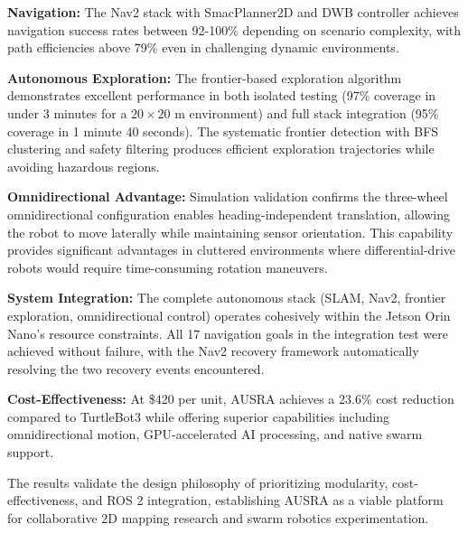 \textbf{Navigation:} The Nav2 stack with SmacPlanner2D and DWB controller achieves navigation success rates between 92-100\% depending on scenario complexity, with path efficiencies above 79\% even in challenging dynamic environments.

\textbf{Autonomous Exploration:} The frontier-based exploration algorithm demonstrates excellent performance in both isolated testing (97\% coverage in under 3 minutes for a $20 \times 20$ m environment) and full stack integration (95\% coverage in 1 minute 40 seconds). The systematic frontier detection with BFS clustering and safety filtering produces efficient exploration trajectories while avoiding hazardous regions.

\textbf{Omnidirectional Advantage:} Simulation validation confirms the three-wheel omnidirectional configuration enables heading-independent translation, allowing the robot to move laterally while maintaining sensor orientation. This capability provides significant advantages in cluttered environments where differential-drive robots would require time-consuming rotation maneuvers.

\textbf{System Integration:} The complete autonomous stack (SLAM, Nav2, frontier exploration, omnidirectional control) operates cohesively within the Jetson Orin Nano's resource constraints. All 17 navigation goals in the integration test were achieved without failure, with the Nav2 recovery framework automatically resolving the two recovery events encountered.

\textbf{Cost-Effectiveness:} At \$420 per unit, AUSRA achieves a 23.6\% cost reduction compared to TurtleBot3 while offering superior capabilities including omnidirectional motion, GPU-accelerated AI processing, and native swarm support.

The results validate the design philosophy of prioritizing modularity, cost-effectiveness, and ROS 2 integration, establishing AUSRA as a viable platform for collaborative 2D mapping research and swarm robotics experimentation.
